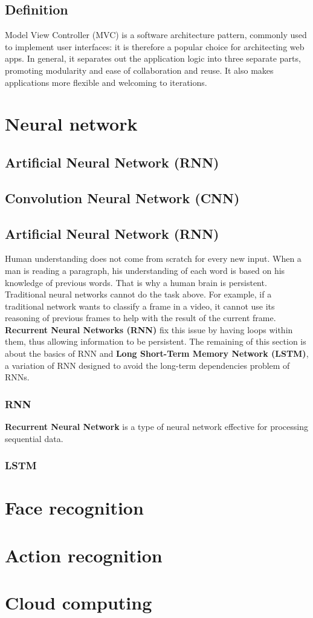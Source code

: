 \subsection{Definition}
Model View Controller (MVC) is a software architecture pattern, commonly used to implement user interfaces: it is therefore a popular choice for architecting web apps. In general, it separates out the application logic into three separate parts, promoting modularity and ease of collaboration and reuse. It also makes applications more flexible and welcoming to iterations.

\section{Neural network}
\subsection{Artificial Neural Network (RNN)}
\subsection{Convolution Neural Network (CNN)}

\subsection{Artificial Neural Network (RNN)}
Human understanding does not come from scratch for every new input. When a man is reading a paragraph, his understanding of each word is based on his knowledge of previous words. That is why a human brain is persistent.\\
Traditional neural networks cannot do the task above. For example, if a traditional network wants to classify a frame in a video, it cannot use its reasoning of previous frames to help with the result of the current frame.
\textbf{Recurrent Neural Networks (RNN)} fix this issue by having loops within them, thus allowing information to be persistent. The remaining of this section is about the basics of RNN and \textbf{Long Short-Term Memory Network (LSTM)}, a variation of RNN designed to avoid the long-term dependencies problem of RNNs.
\subsubsection{RNN}
\textbf{Recurrent Neural Network} is a type of neural network effective for processing sequential data.
\subsubsection{LSTM}

\section{Face recognition}
\section{Action recognition}
\section{Cloud computing}

